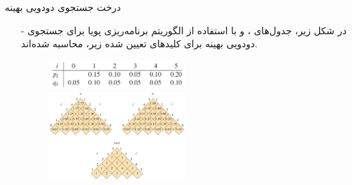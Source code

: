 \begin{frame}{‌درخت جستجوی دودویی بهینه}
\begin{itemize}\itemr
\item[-]
در شکل زیر، جدول‌های
،
و
با استفاده از الگوریتم برنامه‌ریزی پویا برای جستجوی دودویی بهینه برای کلید‌های تعیین شده زیر، محاسبه شده‌اند.
\begin{figure}
\includegraphics[width=0.5\textwidth]{figs/chap04/key-prob-example}
\includegraphics[width=0.5\textwidth]{figs/chap04/bst-example}
\end{figure}
\end{itemize}
\end{frame}